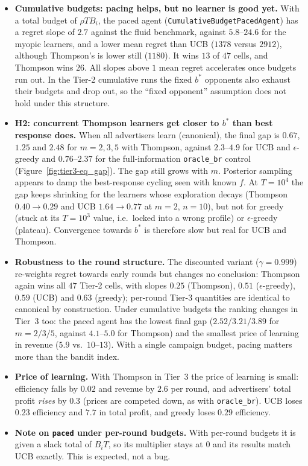 \documentclass[11pt]{article}
\theoremstyle{remark}
\begin{document}
\begin{itemize}[leftmargin=*]
  Thompson's regret per round is flat in $\kappa$ ($0.45$--$0.53$), and UCB's \emph{grows} with
  $\kappa$ ($0.81$ at $\kappa=0.25$ to $3.38$ at $\kappa=1$), because a larger budget lets an optimistic
  learner buy more exploratory impressions per round.
  \item \textbf{Cumulative budgets: pacing helps, but no learner is good yet.} With a total budget of
  $\rho TB_i$, the paced agent (\texttt{CumulativeBudgetPacedAgent}) has a regret slope of $2.7$ against the
  fluid benchmark, against $5.8$--$24.6$ for the myopic learners, and a lower mean regret than UCB
  ($1378$ versus $2912$), although Thompson's is lower still ($1180$). It wins $13$ of $47$ cells, and Thompson wins $26$. All slopes above $1$
  mean regret accelerates once budgets run out. In the Tier-2 cumulative runs the fixed $b^*$ opponents
  also exhaust their budgets and drop out, so the ``fixed opponent'' assumption does not hold under this
  structure.
  \item \textbf{H2: concurrent Thompson learners get closer to $b^*$ than best response does.} When all
  advertisers learn (canonical), the final gap is $0.67$, $1.25$ and $2.48$ for $m=2,3,5$ with Thompson,
  against $2.3$--$4.9$ for UCB and $\epsilon$-greedy and $0.76$--$2.37$ for the full-information
  \texttt{oracle\_br} control (Figure~\ref{fig:tier3-eq_gap}). The gap still grows with $m$. Posterior
  sampling appears to damp the best-response cycling seen with known $f$. At $T=10^4$ the gap keeps
  shrinking for the learners whose exploration decays (Thompson $0.40\to0.29$ and UCB $1.64\to0.77$ at
  $m=2$, $n=10$), but not for greedy (stuck at its $T=10^3$ value, i.e.\ locked into a wrong profile) or
  $\epsilon$-greedy (plateau). Convergence towards $b^*$ is therefore slow but real for UCB and Thompson.
  \item \textbf{Robustness to the round structure.} The discounted variant ($\gamma=0.999$) re-weights
  regret towards early rounds but changes no conclusion: Thompson again wins all $47$ Tier-2 cells, with
  slopes $0.25$ (Thompson), $0.51$ ($\epsilon$-greedy), $0.59$ (UCB) and $0.63$ (greedy); per-round
  Tier-3 quantities are identical to canonical by construction. Under cumulative budgets the ranking
  changes in Tier~3 too: the paced agent has the lowest final gap ($2.52/3.21/3.89$ for $m=2/3/5$,
  against $4.1$--$5.0$ for Thompson) and the smallest price of learning in revenue ($5.9$ vs.\
  $10$--$13$). With a single campaign budget, pacing matters more than the bandit index.
  \item \textbf{Price of learning.} With Thompson in Tier~3 the price of learning is small: efficiency
  falls by $0.02$ and revenue by $2.6$ per round, and advertisers' total profit \emph{rises} by $0.3$
  (prices are competed down, as with \texttt{oracle\_br}). UCB loses $0.23$ efficiency and $7.7$ in
  total profit, and greedy loses $0.29$ efficiency.
  \item \textbf{Note on \texttt{paced} under per-round budgets.} With per-round budgets it is given a
  slack total of $B_iT$, so its multiplier stays at $0$ and its results match UCB exactly. This is
  expected, not a bug.
\end{itemize}
\end{document}
